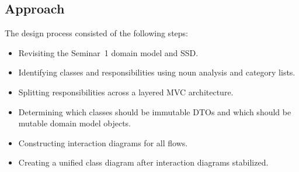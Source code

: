 \documentclass[a4paper]{scrartcl}
\begin{document}
\subsection{Approach}
The design process consisted of the following steps:
\begin{itemize}
  \item Revisiting the Seminar~1 domain model and SSD.
  \item Identifying classes and responsibilities using noun analysis and category lists.
  \item Splitting responsibilities across a layered MVC architecture.
  \item Determining which classes should be immutable DTOs and which should be 
        mutable domain model objects.
  \item Constructing interaction diagrams for all flows.
  \item Creating a unified class diagram after interaction diagrams stabilized.
\end{itemize}
\end{document}
